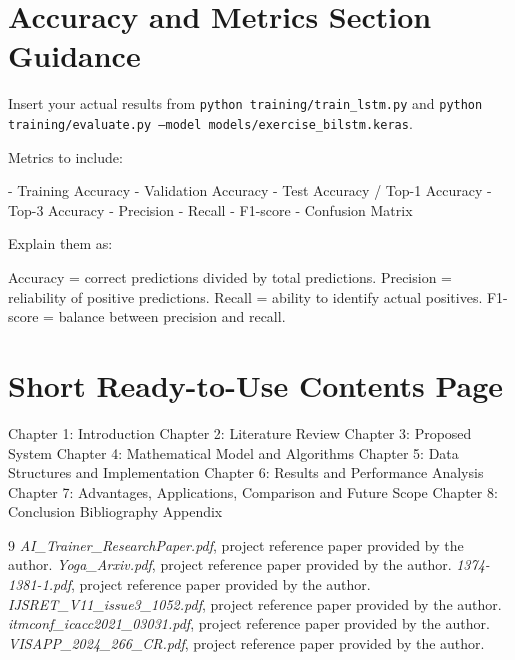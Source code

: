 \documentclass[12pt,a4paper]{report}
\begin{document}
\section*{Accuracy and Metrics Section Guidance}

Insert your actual results from \texttt{python training/train\_lstm.py} and \texttt{python training/evaluate.py --model models/exercise\_bilstm.keras}.

Metrics to include:

- Training Accuracy
- Validation Accuracy
- Test Accuracy / Top-1 Accuracy
- Top-3 Accuracy
- Precision
- Recall
- F1-score
- Confusion Matrix

Explain them as:

Accuracy = correct predictions divided by total predictions.  
Precision = reliability of positive predictions.  
Recall = ability to identify actual positives.  
F1-score = balance between precision and recall.


\section*{Short Ready-to-Use Contents Page}

Chapter 1: Introduction  
Chapter 2: Literature Review  
Chapter 3: Proposed System  
Chapter 4: Mathematical Model and Algorithms  
Chapter 5: Data Structures and Implementation  
Chapter 6: Results and Performance Analysis  
Chapter 7: Advantages, Applications, Comparison and Future Scope  
Chapter 8: Conclusion  
Bibliography  
Appendix


\begin{thebibliography}{9}
 \textit{AI\_Trainer\_ResearchPaper.pdf}, project reference paper provided by the author.
 \textit{Yoga\_Arxiv.pdf}, project reference paper provided by the author.
 \textit{1374-1381-1.pdf}, project reference paper provided by the author.
 \textit{IJSRET\_V11\_issue3\_1052.pdf}, project reference paper provided by the author.
 \textit{itmconf\_icacc2021\_03031.pdf}, project reference paper provided by the author.
 \textit{VISAPP\_2024\_266\_CR.pdf}, project reference paper provided by the author.
\end{thebibliography}
\end{document}
